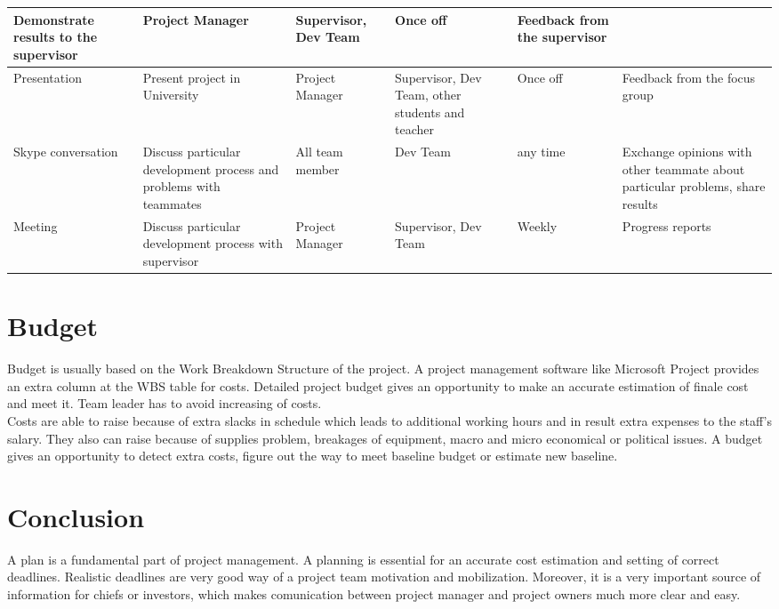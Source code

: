 \documentclass[english]{article}
\begin{document}
\begin{tabular}{|p{1.5cm}|p{3.5cm}|p{2.5cm}|p{1.5cm}|p{1.5cm}|p{3cm}|}
Demonstrate results to the supervisor &
Project Manager &
Supervisor, Dev Team &
Once off &
Feedback from the supervisor\\
\hline 
Presentation & 
Present project in University &
Project Manager &
Supervisor, Dev Team, other students and teacher &
Once off &
Feedback from the focus group \\
\hline 
Skype conversation & 
Discuss particular development process and problems with teammates &
All team member &
Dev Team &
any time &
Exchange opinions with other teammate about particular problems, share results \\
\hline 
Meeting & 
Discuss particular development process with supervisor &
Project Manager &
Supervisor, Dev Team &
Weekly &
Progress reports\\
\hline 
\end{tabular}

\section{Budget}
Budget is usually based on the Work Breakdown Structure of the project. A project management software like Microsoft Project provides an extra column at the WBS table for costs. Detailed project budget gives an opportunity to make an accurate estimation of finale cost and meet it. Team leader has to avoid increasing of costs.\cite{ms} \\

Costs are able to raise because of extra slacks in schedule which leads to additional working hours and in result extra expenses to the staff's salary. They also can raise because of supplies problem, breakages of equipment, macro and micro economical or political issues. A budget gives an opportunity to detect extra costs, figure out the way to meet baseline budget or estimate new baseline.\cite{ms}

\section{Conclusion}
A plan is a fundamental part of project management. A planning is essential for an accurate cost estimation and setting of correct deadlines. Realistic deadlines are very good way of a project team motivation and mobilization. Moreover, it is a very important source of information for chiefs or investors, which makes comunication between project manager and project owners much more clear and easy.\\
\end{document}
